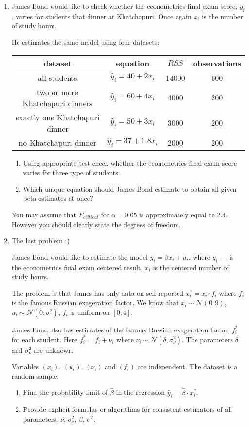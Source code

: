\documentclass[12pt]{article}
\def \cN{\mathcal{N}}
\begin{document}
\begin{enumerate}
\item James Bond would like to check whether the econometrics final exam score, $y_i$, varies for
students that dinner at Khatchapuri. Once again $x_i$ is the number of study hours.

He estimates the same model using four datasets:

\begin{tabular}{cccc}
	\toprule
	dataset & equation & $RSS$ & observations \\
	\midrule
	all students & $\hat y_i = 40 + 2x_i$ & 14000 & 600 \\
	two or more Khatchapuri dinners & $\hat y_i = 60 + 4x_i$ & 4000 & 200 \\
	exactly one Khatchapuri dinner & $\hat y_i = 50 + 3x_i$ & 3000 & 200 \\
	no Khatchapuri dinner & $\hat y_i = 37 + 1.8x_i$ & 2000 & 200 \\
	\bottomrule
\end{tabular}

\begin{enumerate}
	\item Using appropriate test check whether the econometrics final exam score varies for three type of students.
	\item Which unique equation should James Bond estimate to obtain all given beta estimates at once?
\end{enumerate}


You may assume that $F_{critical}$ for $\alpha=0.05$ is approximately equal to $2.4$.
However you should clearly state the degrees of freedom.

\item The last problem :)

James Bond would like to estimate the model $y_i =  \beta x_i + u_i$,
where $y_i$ — is the econometrics final exam centered result, $x_i$ is the centered number of study hours.


The problem is that James has only data on self-reported $x^*_i = x_i \cdot f_i$ where
$f_i$ is the famous Russian exageration factor. We know that $x_i \sim \cN(0;9)$,
$u_i \sim \cN(0;\sigma^2)$, $f_i$ is uniform on $[0;4]$. 

James Bond also has estimates of the famous Russian exageration factor, $f^*_i$ for each student.
Here $f^*_i = f_i + \nu_i$ where $\nu_i \sim \cN(\delta, \sigma^2_{\nu})$. 
The parameters $\delta$ and $\sigma^2_{\nu}$ are unknown.

Variables $(x_i)$, $(u_i)$, $(\nu_i)$ and $(f_i)$ are independent. The dataset is a random sample. 



\begin{enumerate}
	\item Find the probability limit of $\hat\beta$ in the regression $\hat y_i = \hat\beta \cdot x^*_i$.
	\item Provide explicit formulas or algorithms for consistent estimators of all parameters: $\nu$, $\sigma^2_{\nu}$, $\beta$, $\sigma^2$.
\end{enumerate}





\end{enumerate}
\end{document}
